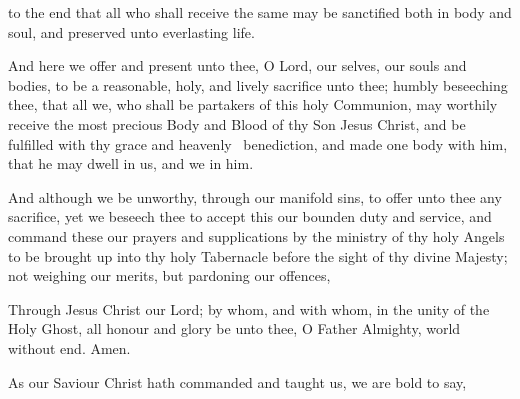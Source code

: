 \centerline{}
to the end that all who shall receive the same may be sanctified both in body and soul, and preserved unto everlasting life. %


\smallskip
{}

And here we %
offer and present unto thee, O Lord, our selves, our souls and bodies, to be a reasonable, holy, and lively sacrifice unto thee; 
humbly beseeching thee, that all we, who shall be partakers
of this holy Communion, may
worthily receive the most precious Body and Blood of thy Son Jesus Christ, and
be fulfilled with thy grace and heavenly \grecross\  benediction,
and made one body with him, that he may dwell in us, and we in him. %

And although we be unworthy, through our manifold sins, to offer unto thee any sacrifice, yet we beseech thee to accept this our bounden duty and service, and command these our prayers and supplications by the ministry of thy holy Angels to be brought up into thy holy Tabernacle before the sight of thy divine Majesty; not weighing our merits, but pardoning our offences,

Through Jesus Christ our Lord; by whom, and with whom, in the unity of the Holy Ghost, all honour and glory be unto thee, O Father Almighty, world without end. \R Amen.

\smallskip
As our Saviour Christ hath commanded and taught us, we are bold to say,

